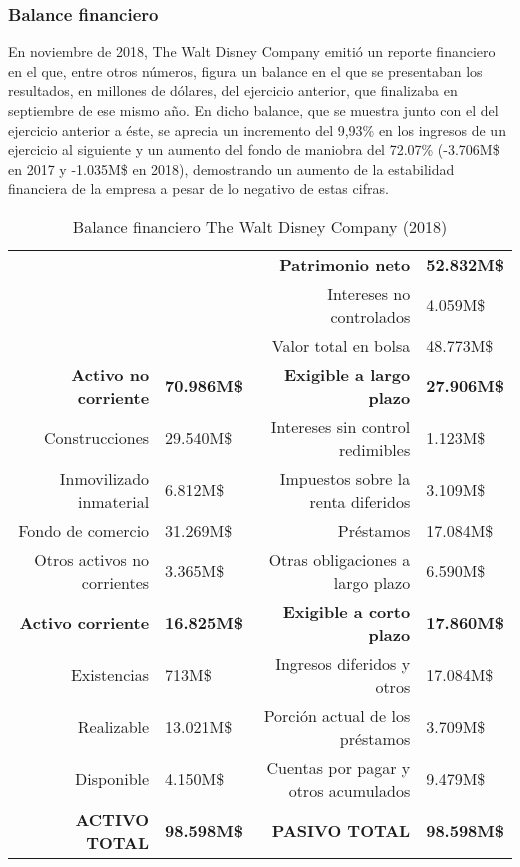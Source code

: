 \subsubsection{Balance financiero}

En noviembre de 2018, The Walt Disney Company emitió un reporte financiero en el que, entre otros números, figura un balance en el que se presentaban los resultados, en millones de dólares, del ejercicio anterior, que finalizaba en septiembre de ese mismo año. En dicho balance, que se muestra junto con el del ejercicio anterior a éste, se aprecia un incremento del 9,93\% en los ingresos de un ejercicio al siguiente y un aumento del fondo de maniobra del 72.07\% (-3.706M\$ en 2017 y -1.035M\$ en 2018), demostrando un aumento de la estabilidad financiera de la empresa a pesar de lo negativo de estas cifras.

\begin{table}[]
\centering
\begin{tabular}{rlrl}
 & & \textbf{Patrimonio neto} & \textbf{52.832M\$} \\
 & & Intereses no controlados & 4.059M\$ \\
 & & Valor total en bolsa & 48.773M\$ \\
\textbf{Activo no corriente} & \textbf{70.986M\$}& \textbf{Exigible a largo plazo} & \textbf{27.906M\$} \\
Construcciones & 29.540M\$ & Intereses sin control redimibles & 1.123M\$ \\
Inmovilizado inmaterial & 6.812M\$ & Impuestos sobre la renta diferidos & 3.109M\$ \\
Fondo de comercio & 31.269M\$ & Préstamos & 17.084M\$ \\
Otros activos no corrientes & 3.365M\$ & Otras obligaciones a largo plazo & 6.590M\$ \\
\textbf{Activo corriente} & \textbf{16.825M\$} & \textbf{Exigible a corto plazo} & \textbf{17.860M\$} \\
Existencias & 713M\$ & Ingresos diferidos y otros & 17.084M\$ \\
Realizable & 13.021M\$ & Porción actual de los préstamos & 3.709M\$ \\
Disponible & 4.150M\$ & Cuentas por pagar y otros acumulados & 9.479M\$ \\
\textbf{ACTIVO TOTAL} & \textbf{98.598M\$} & \textbf{PASIVO TOTAL} & \textbf{98.598M\$}
\end{tabular}
\caption{\label{fig:frog}Balance financiero The Walt Disney Company (2018)}
\end{table}